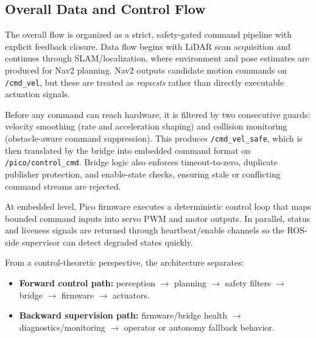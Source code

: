 \documentclass[12pt,a4paper]{report}
\begin{document}
\subsection{Overall Data and Control Flow}
The overall flow is organized as a strict, safety-gated command pipeline with explicit feedback closure. Data flow begins with LiDAR scan acquisition and continues through SLAM/localization, where environment and pose estimates are produced for Nav2 planning. Nav2 outputs candidate motion commands on \texttt{/cmd\_vel}, but these are treated as \emph{requests} rather than directly executable actuation signals.

Before any command can reach hardware, it is filtered by two consecutive guards: velocity smoothing (rate and acceleration shaping) and collision monitoring (obstacle-aware command suppression). This produces \texttt{/cmd\_vel\_safe}, which is then translated by the bridge into embedded command format on \texttt{/pico/control\_cmd}. Bridge logic also enforces timeout-to-zero, duplicate publisher protection, and enable-state checks, ensuring stale or conflicting command streams are rejected.

At embedded level, Pico firmware executes a deterministic control loop that maps bounded command inputs into servo PWM and motor outputs. In parallel, status and liveness signals are returned through heartbeat/enable channels so the ROS-side supervisor can detect degraded states quickly.

From a control-theoretic perspective, the architecture separates:
\begin{itemize}
    \item \textbf{Forward control path:} perception $\rightarrow$ planning $\rightarrow$ safety filters $\rightarrow$ bridge $\rightarrow$ firmware $\rightarrow$ actuators.
    \item \textbf{Backward supervision path:} firmware/bridge health $\rightarrow$ diagnostics/monitoring $\rightarrow$ operator or autonomy fallback behavior.
\end{itemize}
\end{document}
